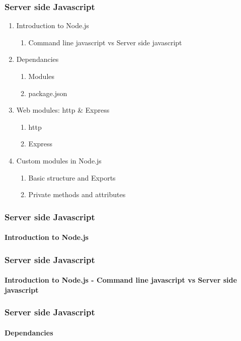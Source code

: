 \documentclass{beamer}
\begin{document}
	\begin{frame}
		\frametitle{Server side Javascript}
		\begin{enumerate}
			\item Introduction to Node.js
			\begin{enumerate}
				\item Command line javascript vs	%
					Server side javascript			%
			\end{enumerate}

			\item Dependancies						%
			\begin{enumerate}
				\item Modules						%
				\item package.json					%
			\end{enumerate}

			\item Web modules: http \& Express		%
			\begin{enumerate}
				\item http							%
				\item Express						%
			\end{enumerate}

			\item Custom modules in Node.js			%
			\begin{enumerate}
				\item Basic structure and Exports	%
				\item Private methods and attributes%
			\end{enumerate}
		\end{enumerate}
	\end{frame}

	\begin{frame}
		\frametitle{Server side Javascript}
		\framesubtitle{Introduction to Node.js}
	\end{frame}

	\begin{frame}[fragile]
		\frametitle{Server side Javascript}
		\framesubtitle{Introduction to Node.js - Command line javascript vs Server side javascript}
	\end{frame}


	\begin{frame}
		\frametitle{Server side Javascript}
		\framesubtitle{Dependancies}
	\end{frame}
\end{document}
